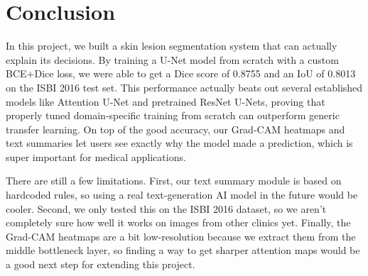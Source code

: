 \documentclass[10pt,journal,compsoc]{IEEEtran}
\begin{document}
\section{Conclusion}

In this project, we built a skin lesion segmentation system that can actually explain its decisions. By training a U-Net model from scratch with a custom BCE+Dice loss, we were able to get a Dice score of 0.8755 and an IoU of 0.8013 on the ISBI 2016 test set. This performance actually beats out several established models like Attention U-Net and pretrained ResNet U-Nets, proving that properly tuned domain-specific training from scratch can outperform generic transfer learning. On top of the good accuracy, our Grad-CAM heatmaps and text summaries let users see exactly why the model made a prediction, which is super important for medical applications.

There are still a few limitations. First, our text summary module is based on hardcoded rules, so using a real text-generation AI model in the future would be cooler. Second, we only tested this on the ISBI 2016 dataset, so we aren't completely sure how well it works on images from other clinics yet. Finally, the Grad-CAM heatmaps are a bit low-resolution because we extract them from the middle bottleneck layer, so finding a way to get sharper attention maps would be a good next step for extending this project.
\end{document}
